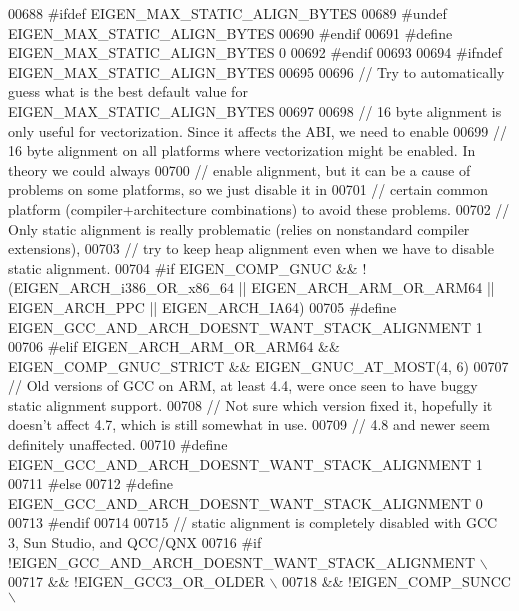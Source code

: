 \begin{DoxyCode}
00688 \textcolor{preprocessor}{  #ifdef EIGEN\_MAX\_STATIC\_ALIGN\_BYTES}
00689 \textcolor{preprocessor}{    #undef EIGEN\_MAX\_STATIC\_ALIGN\_BYTES}
00690 \textcolor{preprocessor}{  #endif}
00691 \textcolor{preprocessor}{  #define EIGEN\_MAX\_STATIC\_ALIGN\_BYTES 0}
00692 \textcolor{preprocessor}{#endif}
00693 
00694 \textcolor{preprocessor}{#ifndef EIGEN\_MAX\_STATIC\_ALIGN\_BYTES}
00695 
00696   \textcolor{comment}{// Try to automatically guess what is the best default value for EIGEN\_MAX\_STATIC\_ALIGN\_BYTES}
00697 
00698   \textcolor{comment}{// 16 byte alignment is only useful for vectorization. Since it affects the ABI, we need to enable}
00699   \textcolor{comment}{// 16 byte alignment on all platforms where vectorization might be enabled. In theory we could always}
00700   \textcolor{comment}{// enable alignment, but it can be a cause of problems on some platforms, so we just disable it in}
00701   \textcolor{comment}{// certain common platform (compiler+architecture combinations) to avoid these problems.}
00702   \textcolor{comment}{// Only static alignment is really problematic (relies on nonstandard compiler extensions),}
00703   \textcolor{comment}{// try to keep heap alignment even when we have to disable static alignment.}
00704 \textcolor{preprocessor}{  #if EIGEN\_COMP\_GNUC && !(EIGEN\_ARCH\_i386\_OR\_x86\_64 || EIGEN\_ARCH\_ARM\_OR\_ARM64 || EIGEN\_ARCH\_PPC ||
       EIGEN\_ARCH\_IA64)}
00705 \textcolor{preprocessor}{  #define EIGEN\_GCC\_AND\_ARCH\_DOESNT\_WANT\_STACK\_ALIGNMENT 1}
00706 \textcolor{preprocessor}{  #elif EIGEN\_ARCH\_ARM\_OR\_ARM64 && EIGEN\_COMP\_GNUC\_STRICT && EIGEN\_GNUC\_AT\_MOST(4, 6)}
00707   \textcolor{comment}{// Old versions of GCC on ARM, at least 4.4, were once seen to have buggy static alignment support.}
00708   \textcolor{comment}{// Not sure which version fixed it, hopefully it doesn't affect 4.7, which is still somewhat in use.}
00709   \textcolor{comment}{// 4.8 and newer seem definitely unaffected.}
00710 \textcolor{preprocessor}{  #define EIGEN\_GCC\_AND\_ARCH\_DOESNT\_WANT\_STACK\_ALIGNMENT 1}
00711 \textcolor{preprocessor}{  #else}
00712 \textcolor{preprocessor}{  #define EIGEN\_GCC\_AND\_ARCH\_DOESNT\_WANT\_STACK\_ALIGNMENT 0}
00713 \textcolor{preprocessor}{  #endif}
00714 
00715   \textcolor{comment}{// static alignment is completely disabled with GCC 3, Sun Studio, and QCC/QNX}
00716 \textcolor{preprocessor}{  #if !EIGEN\_GCC\_AND\_ARCH\_DOESNT\_WANT\_STACK\_ALIGNMENT \(\backslash\)}
00717 \textcolor{preprocessor}{  && !EIGEN\_GCC3\_OR\_OLDER \(\backslash\)}
00718 \textcolor{preprocessor}{  && !EIGEN\_COMP\_SUNCC \(\backslash\)}

\end{DoxyCode}
